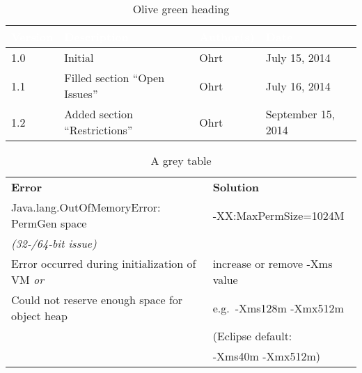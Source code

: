 \begin{center}
\begin{table}[h]
\begin{tabular}{|l|l|l|l|}\hline
\rowcolor{olivegreen30}
\textcolor{white}{\textbf{Version}}
		&
		\textcolor{white}{\textbf{Description}}	&
							\textcolor{white}{\textbf{Author(s)}}	&
																\textcolor{white}{\textbf{Date}}\\\hline
1.0		& Initial				& Ohrt					& July 15, 2014\\\hline
1.1		& Filled section ``Open Issues''	& Ohrt					& July 16, 2014\\\hline
1.2		& Added section ``Restrictions''	& Ohrt					& September 15, 2014\\\hline
\end{tabular}
\caption{Olive green heading} \label{tab:olive}
\end{table}

\begin{table}[h]
\begin{tabular}{ l | l }
\rowcolor{gray20}\textbf{Error}	& \textbf{Solution} \\
\rowcolor{gray5}Java.lang.OutOfMemoryError: PermGen space
									& -XX:MaxPermSize=1024M \\
\rowcolor{gray5}\textit{(32-/64-bit issue)}
									& \\
\rowcolor{gray20}Error occurred during initialization of VM \textit{or}
									& increase or remove -Xms value \\
\rowcolor{gray20}Could not reserve enough space for object heap
									& e.g.\ -Xms128m -Xmx512m \\
\rowcolor{gray20}					& \small{(Eclipse default:}\\
\rowcolor{gray20}					& \small{-Xms40m -Xmx512m)} \\
\end{tabular}
\caption{A grey table} \label{tab:grey}
\end{table}
\end{center}

\chapterend
